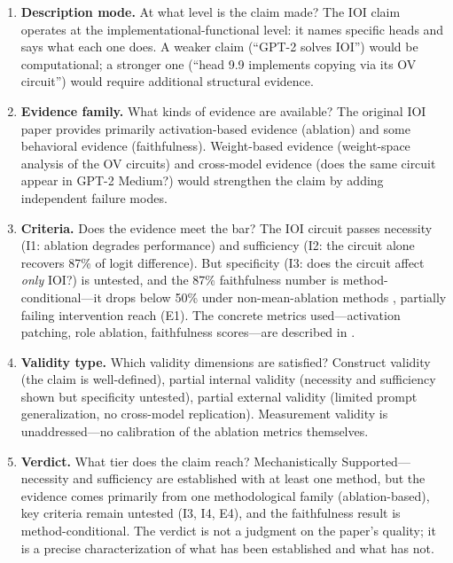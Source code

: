 \documentclass{article}
\begin{document}
\begin{enumerate}[nosep]
\item \textbf{Description mode.} At what level is the claim made? The IOI claim operates at the implementational-functional level: it names specific heads and says what each one does. A weaker claim (``GPT-2 solves IOI'') would be computational; a stronger one (``head 9.9 implements copying via its OV circuit'') would require additional structural evidence.

\item \textbf{Evidence family.} What kinds of evidence are available? The original IOI paper provides primarily activation-based evidence (ablation) and some behavioral evidence (faithfulness). Weight-based evidence (weight-space analysis of the OV circuits) and cross-model evidence (does the same circuit appear in GPT-2 Medium?) would strengthen the claim by adding independent failure modes.

\item \textbf{Criteria.} Does the evidence meet the bar? The IOI circuit passes necessity (I1: ablation degrades performance) and sufficiency (I2: the circuit alone recovers 87\% of logit difference). But specificity (I3: does the circuit affect \emph{only} IOI?) is untested, and the 87\% faithfulness number is method-conditional---it drops below 50\% under non-mean-ablation methods \citep{miller2024transformer}, partially failing intervention reach (E1). The concrete metrics used---activation patching, role ablation, faithfulness scores---are described in .

\item \textbf{Validity type.} Which validity dimensions are satisfied? Construct validity (the claim is well-defined), partial internal validity (necessity and sufficiency shown but specificity untested), partial external validity (limited prompt generalization, no cross-model replication). Measurement validity is unaddressed---no calibration of the ablation metrics themselves.

\item \textbf{Verdict.} What tier does the claim reach? Mechanistically Supported---necessity and sufficiency are established with at least one method, but the evidence comes primarily from one methodological family (ablation-based), key criteria remain untested (I3, I4, E4), and the faithfulness result is method-conditional. The verdict is not a judgment on the paper's quality; it is a precise characterization of what has been established and what has not.
\end{enumerate}
\end{document}
